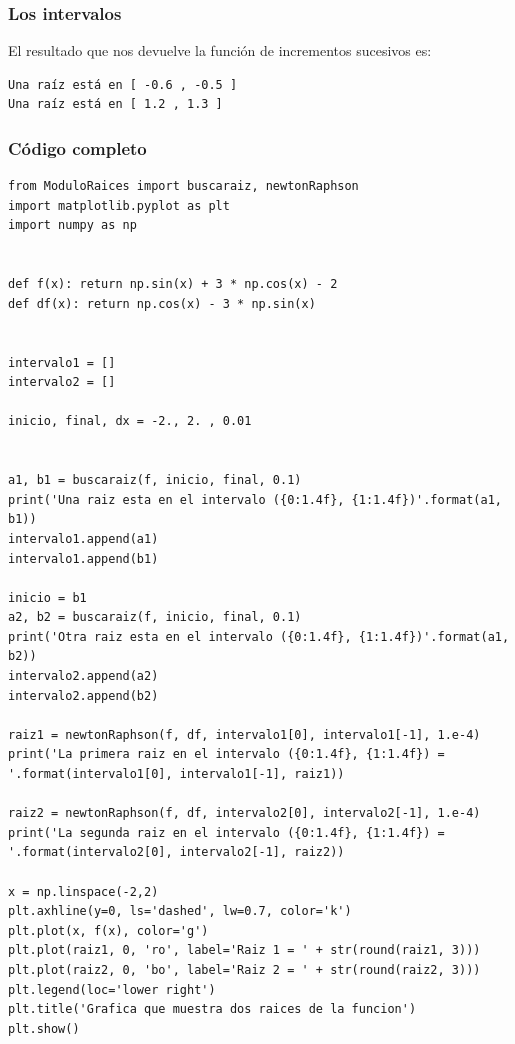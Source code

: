 \documentclass[12pt]{beamer}
\begin{document}
\begin{frame}[fragile]
\frametitle{Los intervalos}
El resultado que nos devuelve la función de incrementos sucesivos es:
\pause
\begin{verbatim}
Una raíz está en [ -0.6 , -0.5 ]
Una raíz está en [ 1.2 , 1.3 ]
\end{verbatim}
\end{frame}
\begin{frame}
\frametitle{Código completo}
\begin{lstlisting}[caption=Código completo para el ejercicio 1]
from ModuloRaices import buscaraiz, newtonRaphson
import matplotlib.pyplot as plt
import numpy as np


def f(x): return np.sin(x) + 3 * np.cos(x) - 2
def df(x): return np.cos(x) - 3 * np.sin(x)


intervalo1 = []
intervalo2 = []

inicio, final, dx = -2., 2. , 0.01


a1, b1 = buscaraiz(f, inicio, final, 0.1)
print('Una raiz esta en el intervalo ({0:1.4f}, {1:1.4f})'.format(a1, b1))
intervalo1.append(a1)
intervalo1.append(b1)

inicio = b1
a2, b2 = buscaraiz(f, inicio, final, 0.1)
print('Otra raiz esta en el intervalo ({0:1.4f}, {1:1.4f})'.format(a1, b2))
intervalo2.append(a2)
intervalo2.append(b2)

raiz1 = newtonRaphson(f, df, intervalo1[0], intervalo1[-1], 1.e-4)
print('La primera raiz en el intervalo ({0:1.4f}, {1:1.4f}) = '.format(intervalo1[0], intervalo1[-1], raiz1))

raiz2 = newtonRaphson(f, df, intervalo2[0], intervalo2[-1], 1.e-4)
print('La segunda raiz en el intervalo ({0:1.4f}, {1:1.4f}) = '.format(intervalo2[0], intervalo2[-1], raiz2))

x = np.linspace(-2,2)
plt.axhline(y=0, ls='dashed', lw=0.7, color='k')
plt.plot(x, f(x), color='g')
plt.plot(raiz1, 0, 'ro', label='Raiz 1 = ' + str(round(raiz1, 3)))
plt.plot(raiz2, 0, 'bo', label='Raiz 2 = ' + str(round(raiz2, 3)))
plt.legend(loc='lower right')
plt.title('Grafica que muestra dos raices de la funcion')
plt.show()
\end{lstlisting}    
\end{frame}
\end{document}
